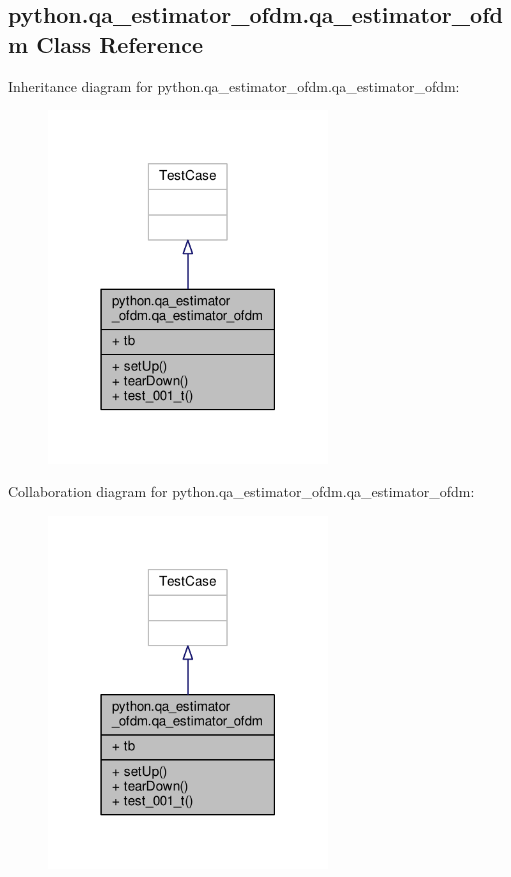 \subsection{python.\+qa\+\_\+estimator\+\_\+ofdm.\+qa\+\_\+estimator\+\_\+ofdm Class Reference}
\label{classpython_1_1qa__estimator__ofdm_1_1qa__estimator__ofdm}


Inheritance diagram for python.\+qa\+\_\+estimator\+\_\+ofdm.\+qa\+\_\+estimator\+\_\+ofdm\+:
\nopagebreak
\begin{figure}[H]
\begin{center}
\leavevmode
\includegraphics[width=210pt]{d4/d5f/classpython_1_1qa__estimator__ofdm_1_1qa__estimator__ofdm__inherit__graph}
\end{center}
\end{figure}


Collaboration diagram for python.\+qa\+\_\+estimator\+\_\+ofdm.\+qa\+\_\+estimator\+\_\+ofdm\+:
\nopagebreak
\begin{figure}[H]
\begin{center}
\leavevmode
\includegraphics[width=210pt]{dc/dd5/classpython_1_1qa__estimator__ofdm_1_1qa__estimator__ofdm__coll__graph}
\end{center}
\end{figure}
